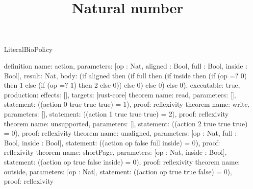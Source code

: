 \begin{lexlean}{LiteralBioPolicy}
\title{Natural number}
\begin{semanticmodule}
definition{
  name: action, parameters: [op : Nat, aligned : Bool, full : Bool, inside : Bool], result: Nat,
  body: (if aligned then (if full then (if inside then
    (if (op =? 0) then 1 else (if (op =? 1) then 2 else 0)) else 0) else 0) else 0),
  executable: true, production: {effects: [], targets: [rust-core]}
}
theorem{
  name: read, parameters: [], statement: ((action 0 true true true) = 1), proof: reflexivity{}
}
theorem{
  name: write, parameters: [], statement: ((action 1 true true true) = 2), proof: reflexivity{}
}
theorem{
  name: unsupported, parameters: [], statement: ((action 2 true true true) = 0), proof: reflexivity{}
}
theorem{
  name: unaligned, parameters: [op : Nat, full : Bool, inside : Bool],
  statement: ((action op false full inside) = 0), proof: reflexivity{}
}
theorem{
  name: shortPage, parameters: [op : Nat, inside : Bool],
  statement: ((action op true false inside) = 0), proof: reflexivity{}
}
theorem{
  name: outside, parameters: [op : Nat],
  statement: ((action op true true false) = 0), proof: reflexivity{}
}
\end{semanticmodule}
\end{lexlean}

